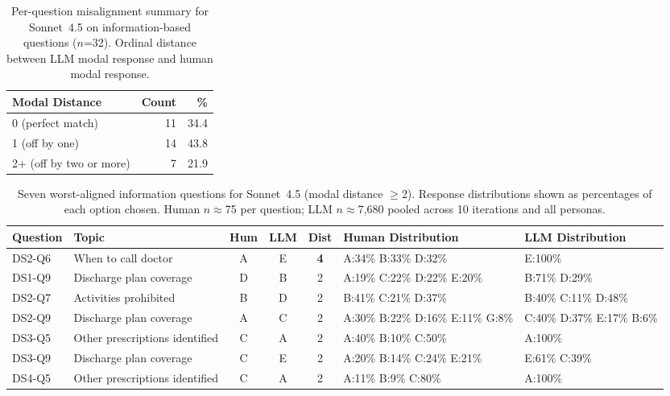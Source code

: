 \begin{table}[htbp]
\centering
\scriptsize
\setlength{\tabcolsep}{5pt}
\caption{Per-question misalignment summary for Sonnet~4.5 on information-based
questions ($n$=32). Ordinal distance between LLM modal response and human
modal response.}
\label{tab:misalignment-summary}
\begin{tabular}{lrr}
\toprule
\textbf{Modal Distance} & \textbf{Count} & \textbf{\%} \\
\midrule
0 (perfect match)       & 11 & 34.4 \\
1 (off by one)          & 14 & 43.8 \\
2+ (off by two or more) &  7 & 21.9 \\
\bottomrule
\end{tabular}
\end{table}

\begin{table}[htbp]
\centering
\scriptsize
\setlength{\tabcolsep}{3pt}
\caption{Seven worst-aligned information questions for Sonnet~4.5 (modal
distance $\ge$2). Response distributions shown as percentages of each
option chosen. Human $n$$\approx$75 per question; LLM
$n$$\approx$7{,}680 pooled across 10 iterations and all personas.}
\label{tab:misalignment-detail}
\begin{tabular}{llcccp{3cm}p{3.5cm}}
\toprule
\textbf{Question} & \textbf{Topic}
& \textbf{Hum} & \textbf{LLM} & \textbf{Dist}
& \textbf{Human Distribution} & \textbf{LLM Distribution} \\
\midrule
DS2-Q6 & When to call doctor & A & E & \textbf{4}
& A:34\% B:33\% D:32\% & E:100\% \\
DS1-Q9 & Discharge plan coverage & D & B & 2
& A:19\% C:22\% D:22\% E:20\% & B:71\% D:29\% \\
DS2-Q7 & Activities prohibited & B & D & 2
& B:41\% C:21\% D:37\% & B:40\% C:11\% D:48\% \\
DS2-Q9 & Discharge plan coverage & A & C & 2
& A:30\% B:22\% D:16\% E:11\% G:8\% & C:40\% D:37\% E:17\% B:6\% \\
DS3-Q5 & Other prescriptions identified & C & A & 2
& A:40\% B:10\% C:50\% & A:100\% \\
DS3-Q9 & Discharge plan coverage & C & E & 2
& A:20\% B:14\% C:24\% E:21\% & E:61\% C:39\% \\
DS4-Q5 & Other prescriptions identified & C & A & 2
& A:11\% B:9\% C:80\% & A:100\% \\
\bottomrule
\end{tabular}
\end{table}

